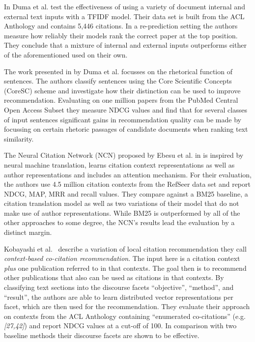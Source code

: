 In \cite{Duma2014} Duma et al. test the effectiveness of using a variety of document internal and external text inputs with a TFIDF model. Their data set is built from the ACL Anthology and contains 5,446 citations. In a re-prediction setting the authors measure how reliably their models rank the correct paper at the top position. %
They conclude that a mixture of internal and external inputs outperforms either of the aforementioned used on their own.

The work presented in \cite{Duma2016} by Duma et al. focusses on the rhetorical function of sentences. The authors classify sentences using the Core Scientific Concepts (CoreSC) scheme and investigate how their distinction can be used to improve recommendation. Evaluating on one million papers from the PubMed Central Open Access Subset they measure NDCG values and find that for several classes of input sentences significant gains in recommendation quality can be made by focussing on certain rhetoric passages of candidate documents when ranking text similarity.

The Neural Citation Network (NCN) proposed by Ebesu et al. in \cite{Ebesu2017} is inspired by neural machine translation, learns citation context representations as well as author representations and includes an attention mechanism. For their evaluation, the authors use 4.5 million citation contexts from the RefSeer data set and report NDCG, MAP, MRR and recall values. They compare against a BM25 baseline, a citation translation model as well as two variations of their model that do not make use of author representations. While BM25 is outperformed by all of the other approaches to some degree, the NCN's results lead the evaluation by a distinct margin.

Kobayashi et al.~\cite{Kobayashi2018} describe a variation of local citation recommendation they call \emph{context-based co-citation recommendation}. The input here is a citation context \emph{plus} one publication referred to in that contexts. The goal then is to recommend other publications that also can be used as citations in that contexts. By classifying text sections into the discourse facets ``objective'', ``method'', and ``result'', the authors are able to learn distributed vector representations per facet, which are then used for the recommendation. They evaluate their approach on contexts from the ACL Anthology containing ``enumerated co-citations'' (e.g. \emph{[27,42]}) and report NDCG values at a cut-off of 100. In comparison with two baseline methods their discourse facets are shown to be effective.

